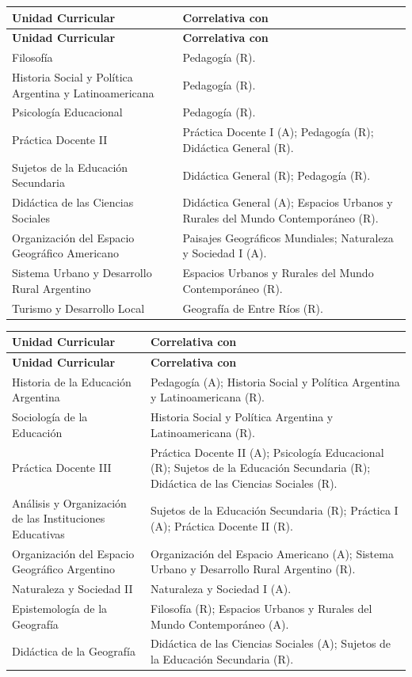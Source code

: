 \thispagestyle{empty}
\PageDecor{\CorrPageNo}

\begingroup
\small
\setlength{\tabcolsep}{4.5pt}
\renewcommand{\arraystretch}{1.34}
\setlength{\LTleft}{0pt}
\setlength{\LTright}{0pt}
\setlength{\LTpre}{0.35em}
\setlength{\LTpost}{0.75em}

\newcommand{\GeoTableStart}{
\begin{longtable}{|>{\RaggedRight\arraybackslash}p{0.30\textwidth}|>{\RaggedRight\arraybackslash}p{0.64\textwidth}|}
\hline
\textbf{Unidad Curricular} & \textbf{Correlativa con} \\
\hline
\endfirsthead
\hline
\textbf{Unidad Curricular} & \textbf{Correlativa con} \\
\hline
\endhead
}

\newcommand{\GeoTableEnd}{
\end{longtable}
}

\newcommand{\GeoRow}[2]{
\rule{0pt}{2.55ex}#1 & #2 \\
\hline
}

\GeoTableStart
\GeoRow{Filosofía}{Pedagogía (R).}
\GeoRow{Historia Social y Política Argentina y Latinoamericana}{Pedagogía (R).}
\GeoRow{Psicología Educacional}{Pedagogía (R).}
\GeoRow{Práctica Docente II}{Práctica Docente I (A); Pedagogía (R); Didáctica General (R).}
\GeoRow{Sujetos de la Educación Secundaria}{Didáctica General (R); Pedagogía (R).}
\GeoRow{Didáctica de las Ciencias Sociales}{Didáctica General (A); Espacios Urbanos y Rurales del Mundo Contemporáneo (R).}
\GeoRow{Organización del Espacio Geográfico Americano}{Paisajes Geográficos Mundiales; Naturaleza y Sociedad I (A).}
\GeoRow{Sistema Urbano y Desarrollo Rural Argentino}{Espacios Urbanos y Rurales del Mundo Contemporáneo (R).}
\GeoRow{Turismo y Desarrollo Local}{Geografía de Entre Ríos (R).}
\GeoTableEnd

\GeoTableStart
\GeoRow{Historia de la Educación Argentina}{Pedagogía (A); Historia Social y Política Argentina y Latinoamericana (R).}
\GeoRow{Sociología de la Educación}{Historia Social y Política Argentina y Latinoamericana (R).}
\GeoRow{Práctica Docente III}{Práctica Docente II (A); Psicología Educacional (R); Sujetos de la Educación Secundaria (R); Didáctica de las Ciencias Sociales (R).}
\GeoRow{Análisis y Organización de las Instituciones Educativas}{Sujetos de la Educación Secundaria (R); Práctica I (A); Práctica Docente II (R).}
\GeoRow{Organización del Espacio Geográfico Argentino}{Organización del Espacio Americano (A); Sistema Urbano y Desarrollo Rural Argentino (R).}
\GeoRow{Naturaleza y Sociedad II}{Naturaleza y Sociedad I (A).}
\GeoRow{Epistemología de la Geografía}{Filosofía (R); Espacios Urbanos y Rurales del Mundo Contemporáneo (A).}
\GeoRow{Didáctica de la Geografía}{Didáctica de las Ciencias Sociales (A); Sujetos de la Educación Secundaria (R).}
\GeoTableEnd

